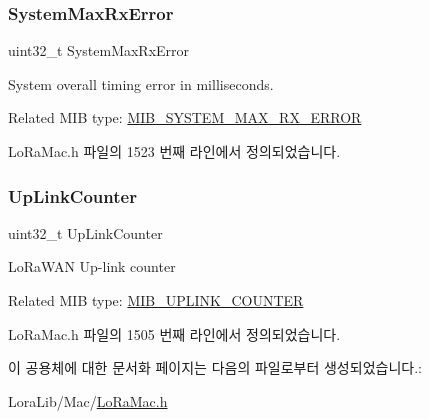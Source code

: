 \mbox{\label{unionu_mib_param_a62adc341212fe903e9995966051c5fee}} 
\subsubsection{\texorpdfstring{System\+Max\+Rx\+Error}{SystemMaxRxError}}
{\footnotesize\ttfamily uint32\+\_\+t System\+Max\+Rx\+Error}

System overall timing error in milliseconds.

Related M\+IB type\+: \mbox{\hyperlink{group___l_o_r_a_m_a_c_gga32ea83d13a3f5bb4b3ec2ace2319ab61ad5d382841f32fba944bdb68b25699e45}{M\+I\+B\+\_\+\+S\+Y\+S\+T\+E\+M\+\_\+\+M\+A\+X\+\_\+\+R\+X\+\_\+\+E\+R\+R\+OR}} 

Lo\+Ra\+Mac.\+h 파일의 1523 번째 라인에서 정의되었습니다.

\mbox{\label{unionu_mib_param_ae8c54ca277e4d7295dfd498889e42fdd}} 
\subsubsection{\texorpdfstring{Up\+Link\+Counter}{UpLinkCounter}}
{\footnotesize\ttfamily uint32\+\_\+t Up\+Link\+Counter}

Lo\+Ra\+W\+AN Up-\/link counter

Related M\+IB type\+: \mbox{\hyperlink{group___l_o_r_a_m_a_c_gga32ea83d13a3f5bb4b3ec2ace2319ab61ad0d2e0023858ce3fab3647fa97428d84}{M\+I\+B\+\_\+\+U\+P\+L\+I\+N\+K\+\_\+\+C\+O\+U\+N\+T\+ER}} 

Lo\+Ra\+Mac.\+h 파일의 1505 번째 라인에서 정의되었습니다.



이 공용체에 대한 문서화 페이지는 다음의 파일로부터 생성되었습니다.\+:\begin{DoxyCompactItemize}
\item 
Lora\+Lib/\+Mac/\mbox{\hyperlink{_lo_ra_mac_8h}{Lo\+Ra\+Mac.\+h}}\end{DoxyCompactItemize}
